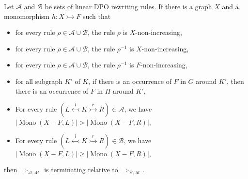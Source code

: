 \begin{theorem}
    \label{thm:termination_grs_ext1} 
    Let \(\mathcal{A}\) and \(\mathcal{B}\) be sets of linear DPO rewriting rules. If there is a graph \(X\) and a monomorphism $h: X \rightarrowtail F$ such that
    \begin{itemize}
        \item for every rule $\rho \in \mathcal{A} \cup \mathcal{B}$, the rule $\rho$ is $X$-non-increasing,
        \item for every rule $\rho \in \mathcal{A} \cup \mathcal{B}$, the rule $\rho^{-1}$ is $X$-non-increasing,
        \item for every rule \(\rho \in \mathcal{A} \cup \mathcal{B}\), the rule $\rho^{-1}$ is $F$-non-increasing,
        \item for all subgraph $K'$ of $K$, if there is an occurrence of $F$ in $G$ around $K'$, then there is an occurrence of $F$ in $H$ around $K'$,
        \item For every rule \(\left( L \overset{l}{\leftarrowtail} K \overset{r}{\rightarrowtail} R \right) \in \mathcal{A}\), we have \(|\operatorname{Mono}(X-F,L)| > |\operatorname{Mono}(X-F,R)|\),
        \item For every rule \(\left( L \overset{l}{\leftarrowtail} K \overset{r}{\rightarrowtail} R \right) \in \mathcal{B}\), we have \(|\operatorname{Mono}(X-F,L)| \geq |\operatorname{Mono}(X-F,R)|\),
    
    \end{itemize}
    then \(\Rightarrow_{\mathcal{A},\mathcal{M}}\) is terminating relative to \(\Rightarrow_{\mathcal{B},\mathcal{M}}\).
\end{theorem}



